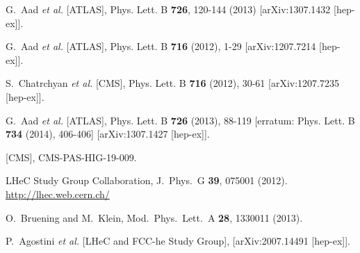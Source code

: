\documentclass[pdftex,twocolumn,epjc3]{svjour3}          %
\begin{document}
\begin{thebibliography}{9}

G.~Aad \textit{et al.} [ATLAS],
Phys. Lett. B \textbf{726}, 120-144 (2013)
[arXiv:1307.1432 [hep-ex]].

G.~Aad \textit{et al.} [ATLAS],
Phys. Lett. B \textbf{716} (2012), 1-29
[arXiv:1207.7214 [hep-ex]].

S.~Chatrchyan \textit{et al.} [CMS],
Phys. Lett. B \textbf{716} (2012), 30-61
[arXiv:1207.7235 [hep-ex]].

G.~Aad \textit{et al.} [ATLAS],
Phys. Lett. B \textbf{726} (2013), 88-119
[erratum: Phys. Lett. B \textbf{734} (2014), 406-406]
[arXiv:1307.1427 [hep-ex]].

[CMS],
CMS-PAS-HIG-19-009.

  LHeC Study Group Collaboration,
  J.\ Phys.\ G {\bf 39}, 075001 (2012).
  \url{http://lhec.web.cern.ch/}

  O.~Bruening and M.~Klein,
  Mod.\ Phys.\ Lett.\ A {\bf 28}, 1330011 (2013).

P.~Agostini \textit{et al.} [LHeC and FCC-he Study Group],
[arXiv:2007.14491 [hep-ex]].


\end{thebibliography}
\end{document}
